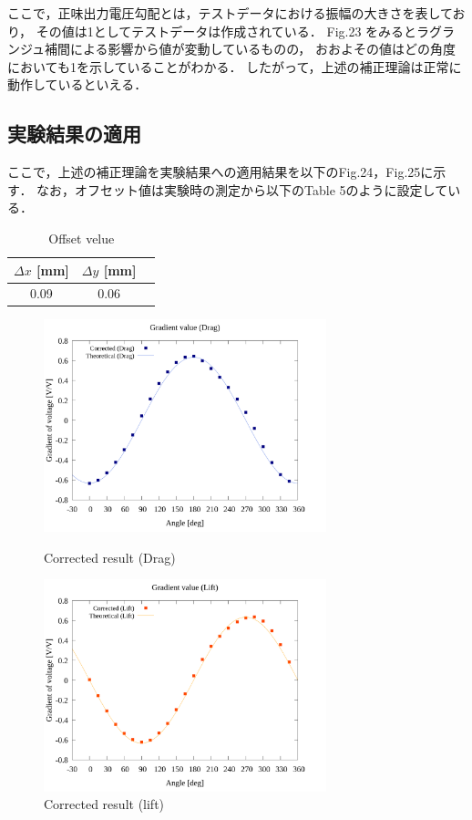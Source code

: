 \documentclass[twocolumn,a4j]{jsarticle}
\begin{document}
\newpage

ここで，正味出力電圧勾配とは，テストデータにおける振幅の大きさを表しており，
その値は1としてテストデータは作成されている．
Fig.23 をみるとラグランジュ補間による影響から値が変動しているものの，
おおよその値はどの角度においても1を示していることがわかる．
したがって，上述の補正理論は正常に動作しているといえる．\\

\subsection{実験結果の適用}

ここで，上述の補正理論を実験結果への適用結果を以下のFig.24，Fig.25に示す．
なお，オフセット値は実験時の測定から以下のTable 5のように設定している．

\begin{table}[htbp]
    \begin{center}
        \caption{Offset velue}
        \begin{tabular}{|p{30mm}|p{20mm}|p{20mm}|}
            \hline
            \multicolumn{1}{|c|}{$\Delta x$ [mm]} & \multicolumn{1}{|c|}{$\Delta y$ [mm]} \\ \hline
            \multicolumn{1}{|c|}{0.09}           & \multicolumn{1}{|c|}{0.06}           \\ \hline
        \end{tabular}
    \end{center}
\end{table}

\begin{figure}[htbp]
    \begin{center}
        \includegraphics[width=82mm]{../../../02_workspace/result/2-ex/plot/21/21-4_corrected_angle_drag.png}
        \caption{Corrected result (Drag)}
        \includegraphics[width=82mm]{../../../02_workspace/result/2-ex/plot/21/21-4_corrected_angle_lift.png}
        \caption{Corrected result (lift)}
    \end{center}
\end{figure}
\end{document}
